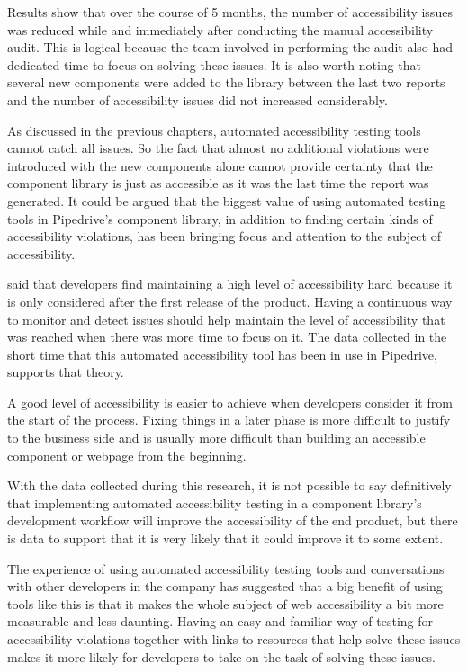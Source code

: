 \documentclass{master_thesis}
\begin{document}
Results show that over the course of 5 months, the number of accessibility issues was reduced while and immediately after conducting the manual accessibility audit. This is logical because the team involved in performing the audit also had dedicated time to focus on solving these issues. It is also worth noting that several new components were added to the library between the last two reports and the number of accessibility issues did not increased considerably.

As discussed in the previous chapters, automated accessibility testing tools cannot catch all issues. So the fact that almost no additional violations were introduced with the new components alone cannot provide certainty that the component library is just as accessible as it was the last time the report was generated. It could be argued that the biggest value of using automated testing tools in Pipedrive's component library, in addition to finding certain kinds of accessibility violations, has been bringing focus and attention to the subject of accessibility.

\citeauthor{Paterno2020} said that developers find maintaining a high level of accessibility hard because it is only considered after the first release of the product. Having a continuous way to monitor and detect issues should help maintain the level of accessibility that was reached when there was more time to focus on it. The data collected in the short time that this automated accessibility tool has been in use in Pipedrive, supports that theory.

A good level of accessibility is easier to achieve when developers consider it from the start of the process. Fixing things in a later phase is more difficult to justify to the business side and is usually more difficult than building an accessible component or webpage from the beginning.

With the data collected during this research, it is not possible to say definitively that implementing automated accessibility testing in a component library's development workflow will improve the accessibility of the end product, but there is data to support that it is very likely that it could improve it to some extent.

The experience of using automated accessibility testing tools and conversations with other developers in the company has suggested that a big benefit of using tools like this is that it makes the whole subject of web accessibility a bit more measurable and less daunting. Having an easy and familiar way of testing for accessibility violations together with links to resources that help solve these issues makes it more likely for developers to take on the task of solving these issues.
\end{document}
